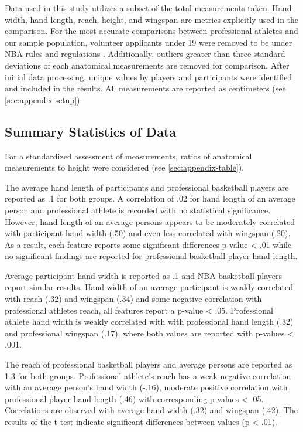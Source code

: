 \documentclass[]{article}
\begin{document}
Data used in this study utilizes a subset of the total measurements
taken. Hand width, hand length, reach, height, and wingspan are metrics
explicitly used in the comparison. For the most accurate comparisons
between professional athletes and our sample population, volunteer
applicants under 19 were removed to be under NBA rules and regulations
\citep{reynolds:2019}. Additionally, outliers greater than three
standard deviations of each anatomical measurements are removed for
comparison. After initial data processing, unique values by players and
participants were identified and included in the results. All
measurements are reported as centimeters (see \ref{sec:appendix-setup}).

\subsection{Summary Statistics of Data}
\label{sec:data-summary}

For a standardized assessment of measurements, ratios of anatomical
measurements to height were considered (see \ref{sec:appendix-table}).

The average hand length of participants and professional basketball
players are reported as .1 for both groups. A correlation of .02 for
hand length of an average person and professional athlete is recorded
with no statistical significance. However, hand length of an average
persons appears to be moderately correlated with participant hand width
(.50) and even less correlated with wingspan (.20). As a result, each
feature reports some significant differences p-value \textless{} .01
while no significant findings are reported for professional basketball
player hand length.

Average participant hand width is reported as .1 and NBA basketball
players report similar results. Hand width of an average participant is
weakly correlated with reach (.32) and wingspan (.34) and some negative
correlation with professional athletes reach, all features report a
p-value \textless{} .05. Professional athlete hand width is weakly
correlated with with professional hand length (.32) and professional
wingspan (.17), where both values are reported with p-values \textless{}
.001.

The reach of professional basketball players and average persons are
reported as 1.3 for both groups. Professional athlete's reach has a weak
negative correlation with an average person's hand width (-.16),
moderate positive correlation with professional player hand length (.46)
with corresponding p-values \textless{} .05. Correlations are observed
with average hand width (.32) and wingspan (.42). The results of the
t-test indicate significant differences between values (p \textless{}
.01).
\end{document}
